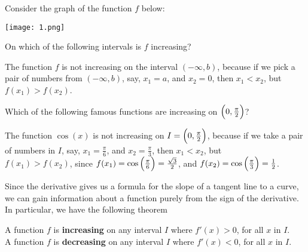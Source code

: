 \documentclass{ximera}
\begin{document}
\begin{question}
\author{Nela Lakos}
	Consider the graph of the function $f$ below:
	\begin{image}
          \texttt{[image: 1.png]}
        \end{image}
On which of the following intervals is $f$ increasing?
\begin{selectAll}
\end{selectAll}
\begin {explanation} The function $f$ is not increasing on the interval $(-\infty,b)$, because if we pick a pair of numbers from $(-\infty,b)$, say, $x_{1}=a$, and $x_{2}=0$,
then $x_{1}<x_{2}$, but  $f(x_{1})>f(x_{2})$.
\end {explanation}
\end{question}
\begin{question}
\author{Nela Lakos}
Which of the following famous functions are increasing on $\Bigl(0,\frac{\pi}{2}\Bigr)$?
\begin{selectAll}
\end{selectAll}
\begin {explanation} The function $\cos{(x)}$ is not increasing on $I=\Bigl(0,\frac{\pi}{2}\Bigr)$, because 
if we take a pair of numbers in $I$, say,  
  $x_{1}=\frac{\pi}{6}$, and   $x_{2}=\frac{\pi}{3}$, then
   $x_{1}<x_{2}$,  but \\$f(x_{1})>f(x_{2})$,  since 
 $f(x_{1})=\cos{\Bigl(\frac{\pi}{6}\Bigr)}=\frac{\sqrt{3}}{2}$, and $f(x_{2})=\cos{}\Bigl(\frac{\pi}{3}\Bigr)=\frac{1}{2}$.
 \end{explanation}
\end{question}
Since the derivative gives us a formula for the slope of a tangent
line to a curve, we can gain information about a function purely from
the sign of the derivative.  In particular, we have the following theorem
\begin{theorem}
A function $f$ is \textbf{increasing} on any interval $I$ where $f'(x)>0$, for all $x$ in $I$.\\
A function $f$  is \textbf{decreasing} on any interval $I$ where $f'(x)<0$, for all $x$ in $I$.\\
 \end{theorem}
\end{document}
